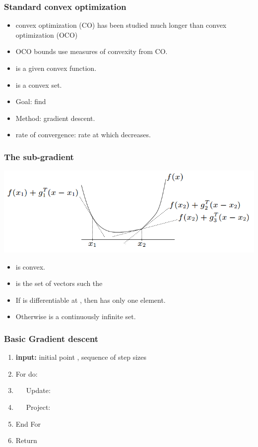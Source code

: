 \documentclass[handout]{beamer}
\begin{document}
\begin{frame}
  \frametitle{Standard convex optimization}
  \begin{itemize}
  \item {} convex optimization (CO) has been studied much
    longer than  convex optimization (OCO)
  \item OCO bounds use measures of convexity from CO.
  \item {} is a given convex function.
  \item \R{$\cK$} is a convex set.
  \item Goal: find 
  \item Method: gradient descent.
  \item rate of convergence: rate at which  decreases.
  \end{itemize}
\end{frame}

\begin{frame}
  \frametitle{The sub-gradient}
  \includegraphics[width=\textwidth]{figures/Subgradient2.png}

  \begin{itemize}
  \item {} is convex.
  \item {} is the set of vectors  such the
    \item If  is differentiable at , then   has only one element.
    \item Otherwise  is a continuously infinite set.
  \end{itemize}
\end{frame}


\begin{frame}
  \frametitle{Basic Gradient descent}

  \begin{enumerate}
    \item {\bf input:}  initial point \R{$\vx_1 \in \cK$},
      sequence of step sizes 
    \item For  do:
    \item ~~~Update: 
    \item ~~~Project: 
    \item End For
    \item Return 
    \end{enumerate}
\end{frame}
\end{document}
